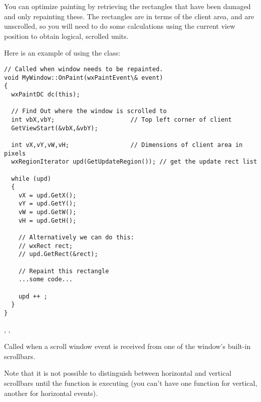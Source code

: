 You can optimize painting by retrieving the rectangles
that have been damaged and only repainting these. The rectangles are in
terms of the client area, and are unscrolled, so you will need to do
some calculations using the current view position to obtain logical,
scrolled units.

Here is an example of using the  class:

{\small%
\begin{verbatim}
// Called when window needs to be repainted.
void MyWindow::OnPaint(wxPaintEvent\& event)
{
  wxPaintDC dc(this);

  // Find Out where the window is scrolled to
  int vbX,vbY;                     // Top left corner of client
  GetViewStart(&vbX,&vbY);

  int vX,vY,vW,vH;                 // Dimensions of client area in pixels
  wxRegionIterator upd(GetUpdateRegion()); // get the update rect list

  while (upd)
  {
    vX = upd.GetX();
    vY = upd.GetY();
    vW = upd.GetW();
    vH = upd.GetH();

    // Alternatively we can do this:
    // wxRect rect;
    // upd.GetRect(&rect);

    // Repaint this rectangle
    ...some code...

    upd ++ ;
  }
}
\end{verbatim}
}%


,\rtfsp
{},\rtfsp
{}

\label{wxwindowonscroll}


Called when a scroll window event is received from one of the window's built-in scrollbars.




Note that it is not possible to distinguish between horizontal and vertical scrollbars
until the function is executing (you can't have one function for vertical, another
for horizontal events).

